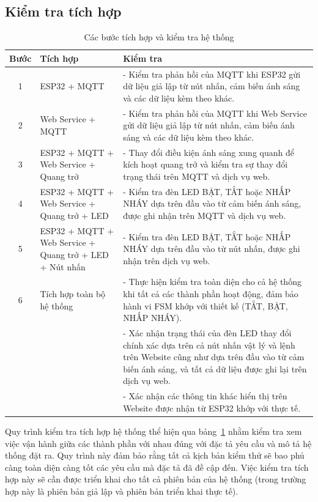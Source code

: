 {\pagebreak
\subsection{Kiểm tra tích hợp}

\begin{table}[h!]
\centering
\small
\begin{tabular}{|c|p{4cm}|p{8cm}|}
\hline
\textbf{Bước} & \textbf{Tích hợp} & \textbf{Kiểm tra} \\ \hline
1 & ESP32 + MQTT & - Kiểm tra phản hồi của MQTT khi ESP32 gửi dữ liệu giả lập từ nút nhấn, cảm biến ánh sáng và các dữ liệu kèm theo khác. \\ \hline
2 & Web Service + MQTT & - Kiểm tra phản hồi của MQTT khi Web Service gửi dữ liệu giả lập từ nút nhấn, cảm biến ánh sáng và các dữ liệu kèm theo khác. \\ \hline
3 & ESP32 + MQTT + Web Service + Quang trở & - Thay đổi điều kiện ánh sáng xung quanh để kích hoạt quang trở và kiểm tra sự thay đổi trạng thái trên MQTT và dịch vụ web. \\ \hline
4 & ESP32 + MQTT + Web Service + Quang trở + LED & - Kiểm tra đèn LED BẬT, TẮT hoặc NHẤP NHÁY dựa trên đầu vào từ cảm biến ánh sáng, được ghi nhận trên MQTT và dịch vụ web. \\ \hline
5 & ESP32 + MQTT + Web Service + Quang trở + LED + Nút nhấn & - Kiểm tra đèn LED BẬT, TẮT hoặc NHẤP NHÁY dựa trên đầu vào từ nút nhấn, được ghi nhận trên dịch vụ web. \\ \hline
6 & Tích hợp toàn bộ hệ thống & - Thực hiện kiểm tra toàn diện cho cả hệ thống khi tất cả các thành phần hoạt động, đảm bảo hành vi FSM khớp với thiết kế (TẮT, BẬT, NHẤP NHÁY). \\
  & & - Xác nhận trạng thái của đèn LED thay đổi chính xác dựa trên cả nút nhấn vật lý và lệnh trên Website cũng như dựa trên đầu vào từ cảm biến ánh sáng, và tất cả dữ liệu được ghi lại trên dịch vụ web. \\
  & & - Xác nhận các thông tin khác hiển thị trên Website được nhận từ ESP32 khớp với thực tế. \\ \hline
\end{tabular}
\caption{Các bước tích hợp và kiểm tra hệ thống}
\label{tab:integration_check}
\end{table}

Quy trình kiểm tra tích hợp hệ thống thể hiện qua bảng~\ref{tab:integration_check} nhằm kiểm tra xem việc vận hành giữa các thành phần với nhau đúng với đặc tả yêu cầu và mô tả hệ thống đặt ra. Quy trình này đảm bảo rằng tất cả kịch bản kiểm thử sẽ bao phủ càng toàn diện càng tốt các yêu cầu mà đặc tả đã đề cập đến. Việc kiểm tra tích hợp này sẽ cần được triển khai cho tất cả phiên bản của hệ thống (trong trường hợp này là phiên bản giả lập và phiên bản triển khai thực tế). 


}

